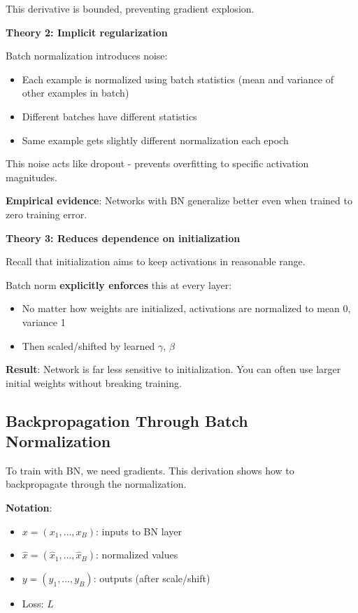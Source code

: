 \documentclass[11pt,oneside]{book}
\begin{document}
This derivative is bounded, preventing gradient explosion.

\textbf{Theory 2: Implicit regularization}

Batch normalization introduces noise:
\begin{itemize}
\item Each example is normalized using batch statistics (mean and variance of other examples in batch)
\item Different batches have different statistics
\item Same example gets slightly different normalization each epoch
\end{itemize}

This noise acts like dropout - prevents overfitting to specific activation magnitudes.

\textbf{Empirical evidence}: Networks with BN generalize better even when trained to zero training error.

\textbf{Theory 3: Reduces dependence on initialization}

Recall that initialization aims to keep activations in reasonable range.

Batch norm \textbf{explicitly enforces} this at every layer:
\begin{itemize}
\item No matter how weights are initialized, activations are normalized to mean 0, variance 1
\item Then scaled/shifted by learned $\gamma$, $\beta$
\end{itemize}

\textbf{Result}: Network is far less sensitive to initialization. You can often use larger initial weights without breaking training.

\subsection{Backpropagation Through Batch Normalization}

To train with BN, we need gradients. This derivation shows how to backpropagate through the normalization.

\textbf{Notation}:
\begin{itemize}
\item $x = (x_1, \ldots, x_B)$: inputs to BN layer
\item $\hat{x} = (\hat{x}_1, \ldots, \hat{x}_B)$: normalized values
\item $y = (y_1, \ldots, y_B)$: outputs (after scale/shift)
\item Loss: $L$
\end{itemize}
\end{document}
